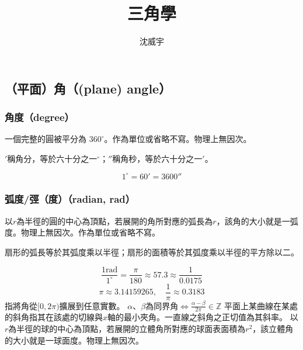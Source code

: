\documentclass[a4paper,12pt]{report}
\begin{document}
\title{三角學}
\author{沈威宇}
\date{\temtoday}
\titletocdoc
{}
\subsection{（平面）角（(plane) angle）}
\subsubsection{角度（degree）}
一個完整的圓被平分為 \(360^{\circ}\)。作為單位或省略不寫。物理上無因次。

$'$稱角分，等於六十分之一$^{\circ}$；$''$稱角秒，等於六十分之一$'$。

\[1^{\circ}=60'=3600''\]
\subsubsection{弧度/弳（度）（radian, rad）}
以$r$為半徑的圓的中心為頂點，若展開的角所對應的弧長為$r$，該角的大小就是一弧度。物理上無因次。作為單位或省略不寫。

扇形的弧長等於其弧度乘以半徑；扇形的面積等於其弧度乘以半徑的平方除以二。

\[\frac{1\text{rad}}{1^{\circ}} = \frac{\pi}{180} \approx 57.3 \approx \frac{1}{0.0175} \]
\[\pi\approx 3.14159265,\quad\frac{1}{\pi}\approx 0.3183\]
指將角從$[0,2\pi)$擴展到任意實數。
$\alpha$、$\beta$為同界角$\iff \frac{\alpha -\beta}{2\pi}\in\mathbb{Z}$
平面上某曲線在某處的斜角指其在該處的切線與$x$軸的最小夾角。一直線之斜角之正切值為其斜率。
以$r$為半徑的球的中心為頂點，若展開的立體角所對應的球面表面積為$r^2$，該立體角的大小就是一球面度。物理上無因次。
\end{document}
